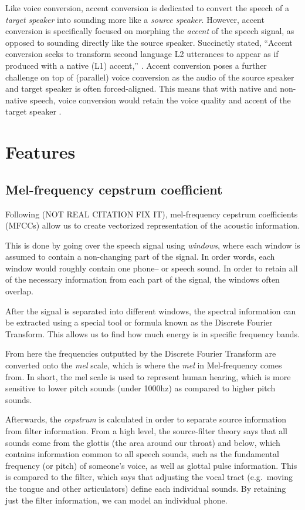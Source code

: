 \documentclass
[
    a4paper,
    twoside,
    12pt
]
{report}
\begin{document}
Like voice conversion, accent conversion is dedicated to convert the
speech of a \emph{target speaker} into sounding more like a \emph{source
speaker}. However, accent conversion is specifically focused on morphing
the \emph{accent} of the speech signal, as opposed to sounding directly
like the source speaker. Succinctly stated, ``Accent conversion seeks to
transform second language L2 utterances to appear as if produced with a
native (L1) accent,'' \parencite{aryal2014a}. Accent conversion poses a
further challenge on top of (parallel) voice conversion as the audio of
the source speaker and target speaker is often forced-aligned. This
means that with native and non-native speech, voice conversion would
retain the voice quality and accent of the target speaker
\parencite{aryal2014}.

\section{Features}\label{features}

\subsection{Mel-frequency cepstrum coefficient}

Following \textcite{jurafsky} (NOT REAL CITATION FIX IT), mel-frequency
cepstrum coefficients (MFCCs) allow us to create vectorized
representation of the acoustic information.

This is done by going over the speech signal using \emph{windows}, where
each window is assumed to contain a non-changing part of the signal. In
order words, each window would roughly contain one phone-- or speech
sound. In order to retain all of the necessary information from each
part of the signal, the windows often overlap.

After the signal is separated into different windows, the spectral
information can be extracted using a special tool or formula known as
the Discrete Fourier Transform. This allows us to find how much energy
is in specific frequency bands.

From here the frequencies outputted by the Discrete Fourier Transform
are converted onto the \emph{mel} scale, which is where the \emph{mel}
in Mel-frequency comes from. In short, the mel scale is used to
represent human hearing, which is more sensitive to lower pitch sounds
(under 1000hz) as compared to higher pitch sounds.

Afterwards, the \emph{cepstrum} is calculated in order to separate
source information from filter information. From a high level, the
source-filter theory says that all sounds come from the glottis (the
area around our throat) and below, which contains information common to
all speech sounds, such as the fundamental frequency (or pitch) of
someone's voice, as well as glottal pulse information. This is compared
to the filter, which says that adjusting the vocal tract (e.g.~moving
the tongue and other articulators) define each individual sounds. By
retaining just the filter information, we can model an individual phone.
\end{document}
